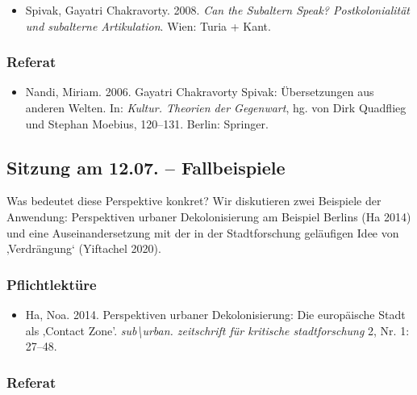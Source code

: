 \documentclass[
  ngerman,
]{article}
\providecommand{\tightlist}{%
  \setlength{\itemsep}{0pt}\setlength{\parskip}{0pt}}
\begin{document}
\begin{itemize}
\tightlist
\item
  Spivak, Gayatri Chakravorty. 2008. \emph{Can the Subaltern Speak? Postkolonialität und subalterne Artikulation}. Wien: Turia + Kant.
\end{itemize}

\hypertarget{referat-10}{%
\subsubsection*{Referat}\label{referat-10}}

\begin{itemize}
\tightlist
\item
  Nandi, Miriam. 2006. Gayatri Chakravorty Spivak: Übersetzungen aus anderen Welten. In: \emph{Kultur. Theorien der Gegenwart}, hg. von Dirk Quadflieg und Stephan Moebius, 120--131. Berlin: Springer.
\end{itemize}

\hypertarget{sitzung-am-12.07.-fallbeispiele}{%
\subsection{Sitzung am 12.07. -- Fallbeispiele}\label{sitzung-am-12.07.-fallbeispiele}}

Was bedeutet diese Perspektive konkret? Wir diskutieren zwei Beispiele der Anwendung: Perspektiven urbaner Dekolonisierung am Beispiel Berlins (Ha 2014) und eine Auseinandersetzung mit der in der Stadtforschung geläufigen Idee von ‚Verdrängung` (Yiftachel 2020).

\hypertarget{pflichtlektuxfcre-11}{%
\subsubsection*{Pflichtlektüre}\label{pflichtlektuxfcre-11}}

\begin{itemize}
\tightlist
\item
  Ha, Noa. 2014. Perspektiven urbaner Dekolonisierung: Die europäische Stadt als ‚Contact Zone'. \emph{sub\textbackslash urban. zeitschrift für kritische stadtforschung} 2, Nr. 1: 27--48.
\end{itemize}

\hypertarget{referat-11}{%
\subsubsection*{Referat}\label{referat-11}}
\end{document}
